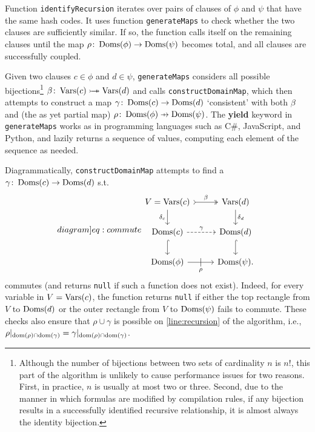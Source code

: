 Function \texttt{identifyRecursion} iterates over pairs of clauses of $\phi$ and
$\psi$ that have the same hash codes. It uses function \texttt{generateMaps} to
check whether the two clauses are sufficiently similar. If so, the function
calls itself on the remaining clauses until the map
$\rho\colon \operatorname{Doms}(\phi) \to \operatorname{Doms}(\psi)$ becomes total, and all clauses are
successfully coupled.


Given two clauses $c \in \phi$ and $d \in \psi$, \texttt{generateMaps} considers
all possible bijections\footnote{Although the number of bijections between two
  sets of cardinality $n$ is $n!$, this part of the algorithm is unlikely to
  cause performance issues for two reasons. First, in practice, $n$ is usually
  at most two or three. Second, due to the manner in which formulas are modified
  by compilation rules, if any bijection results in a successfully identified
  recursive relationship, it is almost always the identity bijection.}
$\beta\colon \operatorname{Vars}(c) \mathrel{\rightarrowtail\kern-1.9ex\twoheadrightarrow} \operatorname{Vars}(d)$ and calls
\texttt{constructDomainMap}, which then attempts to construct a map
$\gamma\colon \operatorname{Doms}(c) \to \operatorname{Doms}(d)$ `consistent' with both $\beta$ and (the as
yet partial map) $\rho\colon \Doms(\phi) \pfun \Doms(\psi)$. The \textbf{yield}
keyword in \texttt{generateMaps} works as in programming languages such as C\#,
JavaScript, and Python, and lazily returns a sequence of values, computing each
element of the sequence as needed.

Diagrammatically, \texttt{constructDomainMap} attempts to find a
$\gamma\colon \operatorname{Doms}(c) \to \operatorname{Doms}(d)$ s.t.
\begin{equation} \label[diagram]{eq:commute}
  \begin{tikzcd}
    V = \Vars(c) \ar[r, tail, two heads, "\beta"] \arrow[d, swap, "\delta_c"] & \Vars(d) \ar[d, "\delta_d"] \\
    \Doms(c) \ar[r, dashed, "\gamma"] \ar[d, hookrightarrow] & \Doms(d) \ar[d, hookrightarrow] \\
    \Doms(\phi) \ar[r, swap, "\rho", "|" marking, outer sep=5pt] & \Doms(\psi).
  \end{tikzcd}
\end{equation}
commutes (and returns \texttt{null} if such a function does not exist). Indeed,
for every variable in $V = \operatorname{Vars}(c)$, the function returns \texttt{null} if
either the top rectangle from $V$ to $\operatorname{Doms}(d)$ or the outer rectangle from $V$
to $\operatorname{Doms}(\psi)$ fails to commute. These checks also ensure that
$\rho \cup \gamma$ is possible on \cref{line:recursion} of the algorithm, i.e.,
$\rho|_{\operatorname{dom}(\rho)\cap\operatorname{dom}(\gamma)} = \gamma|_{\operatorname{dom}(\rho)\cap\operatorname{dom}(\gamma)}$.

